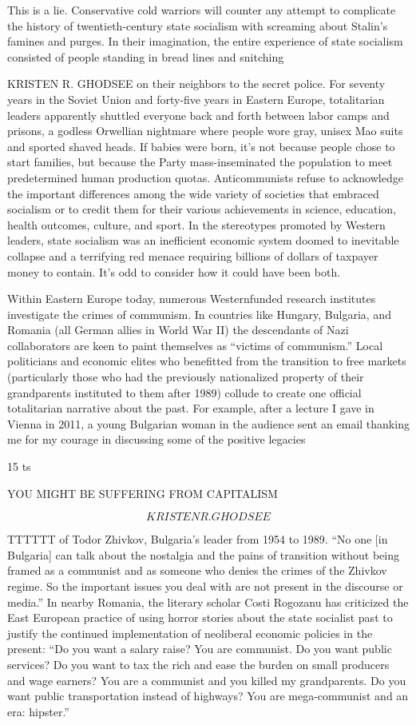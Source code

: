  \par 
This is a lie. Conservative cold warriors will counter any attempt to complicate the history of twentieth-century state socialism with screaming about Stalin’s famines and purges. In their imagination, the entire experience of state socialism consisted of people standing in bread lines and snitching
 \par 
KRISTEN R. GHODSEE on their neighbors to the secret police. For seventy years in the Soviet Union and forty-five years in Eastern Europe, totalitarian leaders apparently shuttled everyone back and forth between labor camps and prisons, a godless Orwellian nightmare where people wore gray, unisex Mao suits and sported shaved heads. If babies were born, it’s not because people chose to start families, but because the Party mass-inseminated the population to meet predetermined human production quotas. Anticommunists refuse to acknowledge the important differences among the wide variety of societies that embraced socialism or to credit them for their various achievements in science, education, health outcomes, culture, and sport. In the stereotypes promoted by Western leaders, state socialism was an inefficient economic system doomed to inevitable collapse and a terrifying red menace requiring billions of dollars of taxpayer money to contain. It’s odd to consider how it could have been both.
 \par 
Within Eastern Europe today, numerous Westernfunded research institutes investigate the crimes of communism. In countries like Hungary, Bulgaria, and Romania (all German allies in World War II) the descendants of Nazi collaborators are keen to paint themselves as “victims of communism.” Local politicians and economic elites who benefitted from the transition to free markets (particularly those who had the previously nationalized property of their grandparents instituted to them after 1989) collude to create one official totalitarian narrative about the past. For example, after a lecture I gave in Vienna in 2011, a young Bulgarian woman in the audience sent an email thanking me for my courage in discussing some of the positive legacies
 \par 
15 ts
 \par 
YOU MIGHT BE SUFFERING FROM CAPITALISM
 \par 
\[KRISTEN R. GHODSEE\]
 \par 
TTTTTT of Todor Zhivkov, Bulgaria's leader from 1954 to 1989. “No one [in Bulgaria] can talk about the nostalgia and the pains of transition without being framed as a communist and as someone who denies the crimes of the Zhivkov regime. So the important issues you deal with are not present in the discourse or media.” In nearby Romania, the literary scholar Costi Rogozanu has criticized the East European practice of using horror stories about the state socialist past to justify the continued implementation of neoliberal economic policies in the present: “Do you want a salary raise? You are communist. Do you want public services? Do you want to tax the rich and ease the burden on small producers and wage earners? You are a communist and you killed my grandparents. Do you want public transportation instead of highways? You are mega-communist and an era: hipster.”
